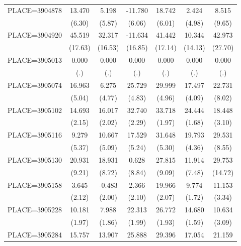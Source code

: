 {\begin{tabular}{l*{6}{c}}
PLACE=3904878       &      13.470&       5.198&     -11.780&      18.742&       2.424&       8.515\\
                    &      (6.30)&      (5.87)&      (6.06)&      (6.01)&      (4.98)&      (9.65)\\
PLACE=3904920       &      45.519&      32.317&     -11.634&      41.442&      10.344&      42.973\\
                    &     (17.63)&     (16.53)&     (16.85)&     (17.14)&     (14.13)&     (27.70)\\
PLACE=3905013       &       0.000&       0.000&       0.000&       0.000&       0.000&       0.000\\
                    &         (.)&         (.)&         (.)&         (.)&         (.)&         (.)\\
PLACE=3905074       &      16.963&       6.275&      25.729&      29.999&      17.497&      22.731\\
                    &      (5.04)&      (4.77)&      (4.83)&      (4.96)&      (4.09)&      (8.02)\\
PLACE=3905102       &      14.693&      16.017&      32.740&      33.718&      24.444&      18.448\\
                    &      (2.15)&      (2.02)&      (2.29)&      (1.97)&      (1.68)&      (3.10)\\
PLACE=3905116       &       9.279&      10.667&      17.529&      31.648&      19.793&      29.531\\
                    &      (5.37)&      (5.09)&      (5.24)&      (5.30)&      (4.36)&      (8.55)\\
PLACE=3905130       &      20.931&      18.931&       0.628&      27.815&      11.914&      29.753\\
                    &      (9.21)&      (8.72)&      (8.84)&      (9.09)&      (7.48)&     (14.72)\\
PLACE=3905158       &       3.645&      -0.483&       2.366&      19.966&       9.774&      11.153\\
                    &      (2.12)&      (2.00)&      (2.10)&      (2.07)&      (1.72)&      (3.34)\\
PLACE=3905228       &      10.181&       7.988&      22.313&      26.772&      14.680&      10.634\\
                    &      (1.97)&      (1.86)&      (1.99)&      (1.93)&      (1.59)&      (3.09)\\
PLACE=3905284       &      15.757&      13.907&      25.888&      29.396&      17.054&      21.159\\

\end{tabular}}
